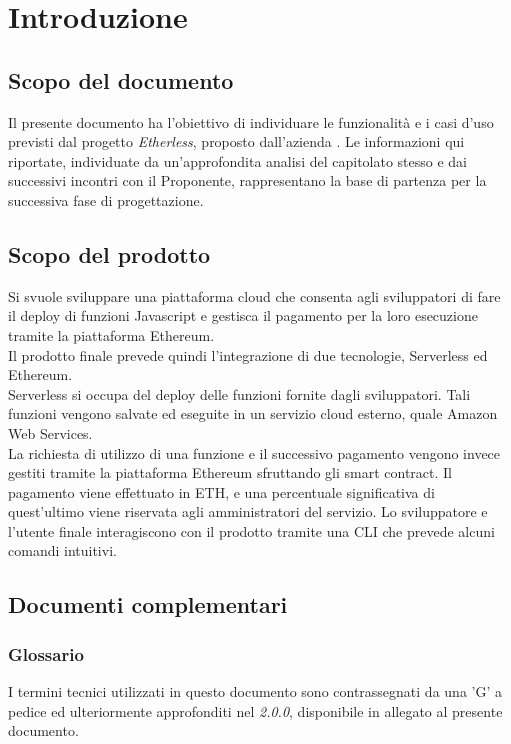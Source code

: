 \section{Introduzione}
\subsection{Scopo del documento}
	Il presente documento ha l'obiettivo di individuare le funzionalità e i casi d'uso previsti dal progetto \textit{Etherless}, proposto dall'azienda \Proponente{}. Le informazioni qui riportate, individuate da un'approfondita analisi del capitolato stesso e dai successivi incontri con il Proponente, rappresentano la base di partenza per la successiva fase di progettazione.

\subsection{Scopo del prodotto}
	Si svuole sviluppare una piattaforma cloud che consenta agli sviluppatori di fare il deploy di funzioni Javascript e gestisca il pagamento per la loro esecuzione tramite la piattaforma Ethereum.\\
	Il prodotto finale prevede quindi l'integrazione di due tecnologie, Serverless ed Ethereum.\\
	Serverless si occupa del deploy delle funzioni fornite dagli sviluppatori. Tali funzioni vengono salvate ed eseguite in un servizio cloud esterno, quale Amazon Web Services.  \\La richiesta di utilizzo di una funzione e il successivo pagamento vengono invece gestiti tramite la piattaforma Ethereum sfruttando gli smart contract. Il pagamento viene effettuato in ETH, e una percentuale significativa di quest'ultimo viene riservata agli amministratori del servizio. 
	Lo sviluppatore e l'utente finale interagiscono con il prodotto tramite una CLI che prevede alcuni comandi intuitivi.

\subsection{Documenti complementari}
\subsubsection{Glossario}
	I termini tecnici utilizzati in questo documento sono contrassegnati da una ’G’ a pedice ed ulteriormente approfonditi nel \Glossario{} \textit{2.0.0}, disponibile in allegato al presente documento.

